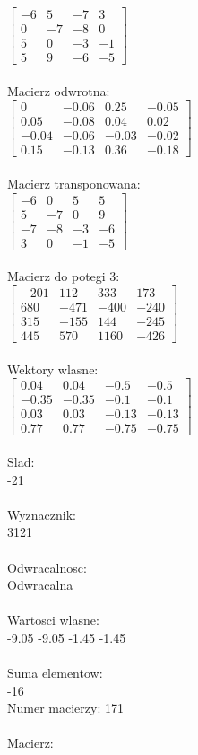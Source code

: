 \documentclass[a4paper,12pt]{article}
\begin{document}
$\begin{bmatrix} -6&5&-7&3\\0&-7&-8&0\\5&0&-3&-1\\5&9&-6&-5 \end{bmatrix}$
\\
\\
Macierz odwrotna:\\

$\begin{bmatrix} 0&-0.06&0.25&-0.05\\0.05&-0.08&0.04&0.02\\-0.04&-0.06&-0.03&-0.02\\0.15&-0.13&0.36&-0.18 \end{bmatrix}$
\\
\\
Macierz transponowana:\\

$\begin{bmatrix} -6&0&5&5\\5&-7&0&9\\-7&-8&-3&-6\\3&0&-1&-5 \end{bmatrix}$
\\
\\
Macierz do potegi 3:\\

$\begin{bmatrix} -201&112&333&173\\680&-471&-400&-240\\315&-155&144&-245\\445&570&1160&-426 \end{bmatrix}$
\\
\\
Wektory wlasne:\\

$\begin{bmatrix} 0.04&0.04&-0.5&-0.5\\-0.35&-0.35&-0.1&-0.1\\0.03&0.03&-0.13&-0.13\\0.77&0.77&-0.75&-0.75 \end{bmatrix}$
\\
\\
Slad:\\
-21
\\
\\
Wyznacznik:\\
3121
\\
\\
Odwracalnosc:\\
Odwracalna
\\
\\
Wartosci wlasne:\\
-9.05 -9.05 -1.45 -1.45
\\
\\
Suma elementow:\\
-16
\\
\newpage
Numer macierzy:
171
\\
\\
Macierz:\\
\end{document}
